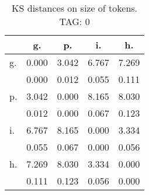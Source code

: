\begin{table}[h!]
\begin{center}
\begin{tabular}{| l | c | c | c | c |}\hline
 & g. & p. & i. & h. \\\hline
g. & 0.000  & 3.042  & 6.767  & 7.269 \\\hline
 & 0.000  & 0.012  & 0.055  & 0.111 \\\hline
p. & 3.042  & 0.000  & 8.165  & 8.030 \\\hline
 & 0.012  & 0.000  & 0.067  & 0.123 \\\hline
i. & 6.767  & 8.165  & 0.000  & 3.334 \\\hline
 & 0.055  & 0.067  & 0.000  & 0.056 \\\hline
h. & 7.269  & 8.030  & 3.334  & 0.000 \\\hline
 & 0.111  & 0.123  & 0.056  & 0.000 \\\hline
\end{tabular}
\caption{KS distances on size of tokens. TAG: 0}
\end{center}
\end{table}